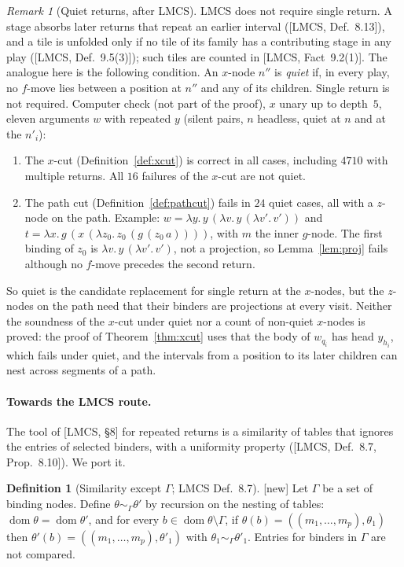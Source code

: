 \documentclass[11pt]{article}
\newcommand{\New}{\textsf{[new]}}
\theoremstyle{plain}
\theoremstyle{definition}
\newtheorem{definition}[theorem]{Definition}
\theoremstyle{remark}
\newtheorem{remark}[theorem]{Remark}
\begin{document}
\begin{remark}[Quiet returns, after LMCS]\label{rem:quiet}
LMCS does not require single return.  A stage absorbs later returns that
repeat an earlier interval ([LMCS, Def.~8.13]), and a tile is unfolded
only if no tile of its family has a contributing stage in any play
([LMCS, Def.~9.5(3)]); such tiles are counted in [LMCS, Fact~9.2(1)].
The analogue here is the following condition.  An $x$-node $n''$ is
\emph{quiet} if, in every play, no $f$-move lies between a position at
$n''$ and any of its children.  Single return is not required.
Computer check (not part of the proof), $x$ unary up to depth~$5$,
eleven arguments $w$ with repeated $y$ (silent pairs, $n$ headless,
quiet at $n$ and at the $n'_i$):
\begin{enumerate}
\item The $x$-cut (Definition~\ref{def:xcut}) is correct in all cases,
  including $4710$ with multiple returns.  All $16$ failures of the
  $x$-cut are not quiet.
\item The path cut (Definition~\ref{def:pathcut}) fails in $24$ quiet
  cases, all with a $z$-node on the path.  Example:
  $w=\lambda y.\,y\,(\lambda v.\,y\,(\lambda v'.\,v'))$ and
  $t=\lambda x.\,g\,(x\,(\lambda z_0.\,z_0\,(g\,(z_0\,a))))$, with $m$
  the inner $g$-node.  The first binding of $z_0$ is
  $\lambda v.\,y\,(\lambda v'.\,v')$, not a projection, so
  Lemma~\ref{lem:proj} fails although no $f$-move precedes the second
  return.
\end{enumerate}
So quiet is the candidate replacement for single return at the $x$-nodes,
but the $z$-nodes on the path need that their binders are projections at
every visit.  Neither the soundness of the $x$-cut under quiet nor a
count of non-quiet $x$-nodes is proved: the proof of
Theorem~\ref{thm:xcut} uses that the body of $w_{q_i}$ has head
$y_{h_i}$, which fails under quiet, and the intervals from a position
to its later children can nest across segments of a path.
\end{remark}
\paragraph{Towards the LMCS route.}  The tool of [LMCS, \S8] for repeated
returns is a similarity of tables that ignores the entries of selected
binders, with a uniformity property ([LMCS, Def.~8.7, Prop.~8.10]).  We
port it.

\begin{definition}[Similarity except $\Gamma$; LMCS Def.~8.7]\label{def:simG}
\New{} Let $\Gamma$ be a set of binding nodes.  Define $\theta\sim_\Gamma
\theta'$ by recursion on the nesting of tables:
$\operatorname{dom}\theta=\operatorname{dom}\theta'$, and for every
$b\in\operatorname{dom}\theta\setminus\Gamma$, if
$\theta(b)=((m_1,\dots,m_p),\theta_1)$ then
$\theta'(b)=((m_1,\dots,m_p),\theta'_1)$ with
$\theta_1\sim_\Gamma\theta'_1$.  Entries for binders in $\Gamma$ are not
compared.
\end{definition}
\end{document}
